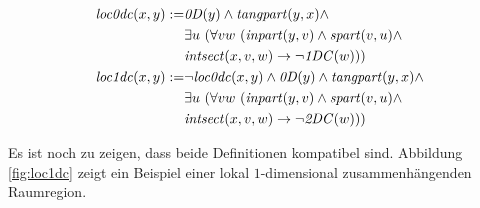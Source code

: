 

    \begin{dfn}
        \begin{align*}
            \Gloczerodc(x,y) := &\GzeroD(y) \land \Gtangpart(y,x) \land
                                \\
                                &\exists u\ (\forall v w\ (\Ginpart(y,v) \land \Gspart(v,u) \land
                                \\
                                &\Gintersect(x,v,w) \to \neg \GoneDC(w)))
                                \\
            \Gloconedc(x,y) := &\neg \Gloczerodc(x,y) \land \GzeroD(y) \land \Gtangpart(y,x) \land
                                \\
                                &\exists u\ (\forall v w\ (\Ginpart(y,v) \land \Gspart(v,u) \land
                                \\
                                &\Gintersect(x,v,w) \to \neg \GtwoDC(w)))
        \end{align*}

    \end{dfn}

    Es ist noch zu zeigen, dass beide Definitionen kompatibel sind.
    Abbildung \ref{fig:loc1dc} zeigt ein Beispiel einer lokal $1$-dimensional zusammenhängenden Raumregion.

